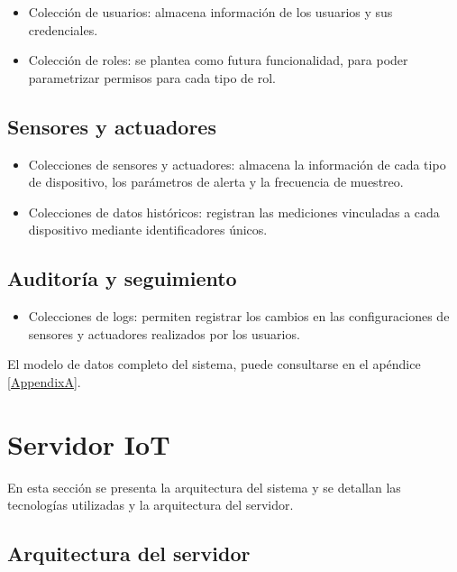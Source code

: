 \begin{itemize}
    \item Colección de usuarios: almacena información de los usuarios y sus credenciales.
    \item Colección de roles: se plantea como futura funcionalidad, para poder
          parametrizar permisos para cada tipo de rol.
\end{itemize}

\subsection{Sensores y actuadores}
\begin{itemize}
    \item Colecciones de sensores y actuadores: almacena la información de cada tipo de
          dispositivo, los parámetros de alerta y la frecuencia de muestreo.
    \item Colecciones de datos históricos: registran las mediciones vinculadas a cada
          dispositivo mediante identificadores únicos.
\end{itemize}

\subsection{Auditoría y seguimiento}
\begin{itemize}
    \item Colecciones de logs: permiten registrar los cambios en las configuraciones de
          sensores y actuadores realizados por los usuarios.
\end{itemize}

El modelo de datos completo del sistema, puede consultarse en el apéndice
\ref{AppendixA}.

\section{Servidor IoT}

En esta sección se presenta la arquitectura del sistema y se detallan las
tecnologías utilizadas y la arquitectura del servidor.

\subsection{Arquitectura del servidor}

